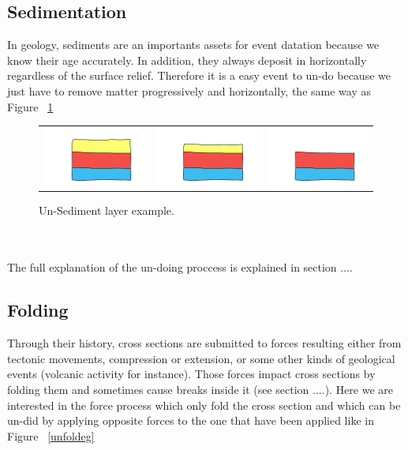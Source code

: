 \documentclass[12pt, a4paper]{report} %
\begin{document}
\subsection{Sedimentation}
In geology, sediments are an importants assets for event datation because we know their age accurately. In addition, they always deposit in horizontally regardless of the surface relief. Therefore it is a easy event to un-do because we just have to remove matter progressively and horizontally, the same way as Figure ~\ref{unsedeg}
\begin{figure}[htb]
\centering
\begin{tabular}{@{}ccc@{}}
\includegraphics[width=.35\textwidth]{unSedimentDescription0.png}&
\includegraphics[width=.35\textwidth]{unSedimentDescription1.png}&
\includegraphics[width=.35\textwidth]{unSedimentDescription2.png}\\
\end{tabular}
\caption{Un-Sediment layer example.}
\label{unsedeg}
\end{figure}\\\\
The full explanation of the un-doing proccess is explained in section ....

\subsection{Folding}
\label{sub:fold}
Through their history, cross sections are submitted to forces resulting either from tectonic movements, compression or extension, or some other kinds of geological events (volcanic activity for instance). Those forces impact cross sections by folding them and sometimes cause breaks inside it (see section ....). Here we are interested in the force process which only fold the cross section and which can be un-did by applying opposite forces to the one that have been applied like in Figure ~\ref{unfoldeg}
\end{document}

